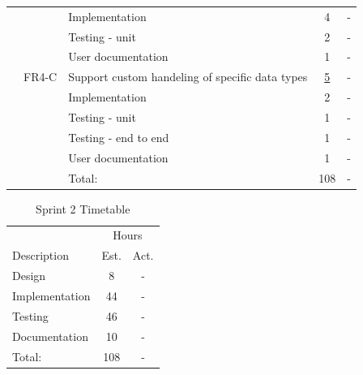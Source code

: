 \begin{table}[!ht]
\begin{tabularx}{\textwidth}{l l X c c}
	   &  & Implementation			   	& 4 & -\\
	   &  & Testing - unit				   	& 2 & -\\
	   &  & User documentation			& 1 & -\\
	\addlinespace
	13 & FR4-C & Support custom handeling of specific data types & \underline{ 5 } & - \\
	   &  & Implementation			   	& 2 & -\\
	   &  & Testing - unit				   	& 1 & -\\
	   &  & Testing - end to end			& 1 & -\\
	   &  & User documentation			& 1 & -\\
	\midrule
	& & Total: & 108  & - \\
	\bottomrule
\end{tabularx}
\end{table}



\begin{table}[!ht] \small \center
\caption{Sprint 2 Timetable\label{tab:sprint2time}}
\begin{tabularx}{\textwidth}{X c c}
	\toprule
	& \multicolumn{2}{c}{Hours} \\
	\cmidrule(r){2-3}
	Description & Est. & Act. \\
	\midrule
	Design & 8 & -\\
	\addlinespace
	Implementation & 44 & - \\
	\addlinespace
	Testing & 46 & -\\
	\addlinespace
	Documentation & 10 & -\\
	\midrule
	Total: & 108 & - \\
	\bottomrule
\end{tabularx}
\end{table}

